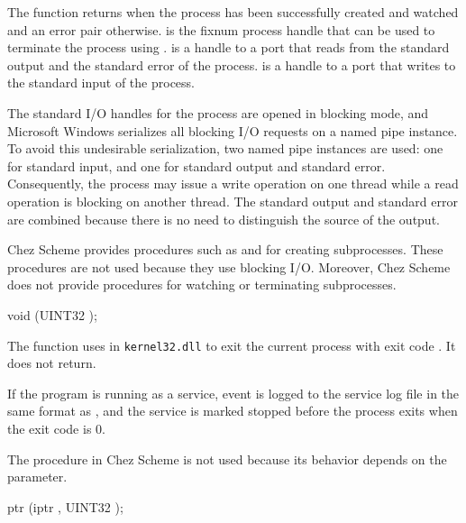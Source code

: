 The  function returns
 when the
process has been successfully created and watched and an error pair
otherwise.   is the fixnum process handle that can be
used to terminate the process using .
 is a handle to a port that reads from the standard output
and the standard error of the process.   is a handle to a
port that writes to the standard input of the process.

The standard I/O handles for the process are opened in blocking mode,
and Microsoft Windows serializes all blocking I/O requests on a named
pipe instance. To avoid this undesirable serialization, two named pipe
instances are used: one for standard input, and one for standard
output and standard error. Consequently, the process may issue a write
operation on one thread while a read operation is blocking on another
thread.  The standard output and standard error are combined because
there is no need to distinguish the source of the output.

Chez Scheme provides procedures such as  and
 for creating subprocesses. These procedures are not
used because they use blocking I/O. Moreover, Chez Scheme does not
provide procedures for watching or terminating subprocesses.

\begin{function}
  void (UINT32 );
\end{function}\antipar

The  function uses  in
\texttt{kernel32.dll} to exit the current process with exit code
. It does not return.

If the program is running as a service, event
 is logged to the service log
file in the same format as , and the
service is marked stopped before the process exits when the exit code
is 0.

The  procedure in Chez Scheme is not used because its
behavior depends on the  parameter.

\begin{function}
  ptr (iptr , UINT32
  );
\end{function}\antipar

